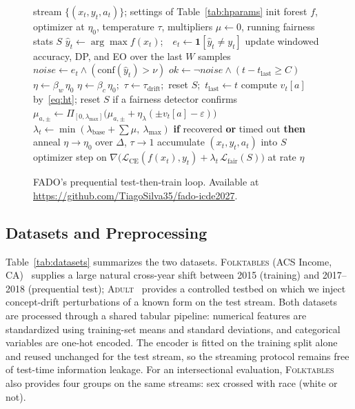 \documentclass[conference]{IEEEtran}
\newcommand{\fado}{\textsc{FADO}}
\newcommand{\adult}{\textsc{Adult}}
\newcommand{\folk}{\textsc{Folktables}}
\newcommand{\rev}[1]{{\color{blue}#1}}
\renewcommand{\rev}[1]{#1}
\begin{document}
\begin{figure}[t]
\footnotesize
\begin{algorithmic}[1]
\Require stream $\{(x_t,y_t,a_t)\}$; settings of Table~\ref{tab:hparams}
\State init forest $f$, optimizer at $\eta_0$, temperature $\tau$, multipliers $\mu\gets0$, running fairness stats $S$
  \State $\hat{y}_t \gets \arg\max f(x_t)$;\ \ $e_t \gets \mathbf{1}[\hat{y}_t \neq y_t]$ 
  \State update windowed accuracy, DP, and EO over the last $W$ samples
  \State $\textit{noise} \gets e_t \wedge (\text{conf}(\hat{y}_t) > \nu)$ 
  \State $\textit{ok} \gets \neg\textit{noise} \wedge (t-t_{\text{last}}\geq C)$ 
   $\eta \gets \beta_w\,\eta_0$  \EndIf
     \State $\eta \gets \beta_c\,\eta_0$;\ $\tau \gets \tau_{\mathrm{drift}}$;\ reset $S$;\ $t_{\text{last}}\gets t$ 
  \EndIf
  \State compute $v_t[a]$ by~\eqref{eq:ht}; reset $S$ if a fairness detector confirms
  \State $\mu_{a,\pm} \gets \Pi_{[0,\lambda_{\max}]}\big(\mu_{a,\pm} + \eta_\lambda(\pm v_t[a]-\varepsilon)\big)$ 
  \State $\lambda_t \gets \min(\lambda_{\mathrm{base}}+\sum\mu,\ \lambda_{\max})$
  \State \textbf{if} recovered \textbf{or} timed out \textbf{then} anneal $\eta\!\to\!\eta_0$ over $\Delta$, $\tau\!\to\!1$
  \State accumulate $(x_t,y_t,a_t)$ into $S$ 
  \State optimizer step on $\nabla\big(\mathcal{L}_{\mathrm{CE}}(f(x_t),y_t) + \lambda_t\,\mathcal{L}_{\mathrm{fair}}(S)\big)$ at rate $\eta$
\EndFor
\end{algorithmic}
\caption{\fado{}'s prequential test-then-train loop. Available at \protect\url{https://github.com/TiagoSilva35/fado-icde2027}.}
\label{fig:alg}
\end{figure}

\subsection{Datasets and Preprocessing}
\label{sec:method:data}
Table~\ref{tab:datasets} summarizes the two datasets. \folk{} (ACS Income, CA)~\cite{ding2022retiringadultnewdatasets} supplies a large natural cross-year shift between 2015
(training) and 2017--2018 (prequential test); \adult{}~\cite{adult_2} provides a controlled testbed on which we inject concept-drift perturbations of a
known form on the test stream. Both datasets are processed through a shared tabular pipeline: numerical features are standardized using training-set means and
standard deviations, and categorical variables are one-hot encoded. The encoder is fitted on the training split alone and reused unchanged for the test stream, so
the streaming protocol remains free of test-time information leakage. \rev{For an intersectional evaluation, \folk{} also provides four groups on the same
streams: sex crossed with race (white or not).}
\end{document}
